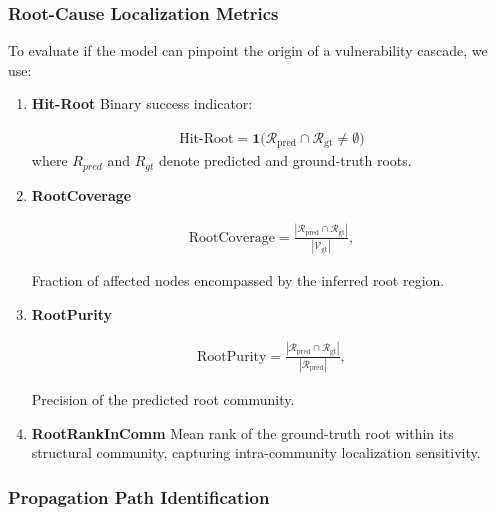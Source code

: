 \subsubsection{Root-Cause Localization Metrics}
To evaluate if the model can pinpoint the origin of a vulnerability cascade, we use:
\begin{enumerate}
    \item \textbf{Hit-Root}
    Binary success indicator:
    
    \begin{align}
    \mathrm{Hit\text{-}Root} = \mathbf{1}\bigl(\mathcal{R}_{\text{pred}} \cap \mathcal{R}_{\text{gt}} \neq \emptyset\bigr)
    \end{align}
    where $R_{pred}$ and $R_{gt}$ denote predicted and ground-truth roots.

    \item \textbf{RootCoverage}

    \begin{align}
    \mathrm{RootCoverage} = \frac{|\mathcal{R}_{\text{pred}} \cap \mathcal{R}_{\text{gt}}|}{|\mathcal{V}_{\text{gt}}|},
    \end{align}
    
    Fraction of affected nodes encompassed by the inferred root region.

    \item \textbf{RootPurity}
    
    \begin{align}
    \mathrm{RootPurity} = \frac{|\mathcal{R}_{\text{pred}} \cap \mathcal{R}_{\text{gt}}|}{|\mathcal{R}_{\text{pred}}|},
    \end{align}
    
    Precision of the predicted root community.

    \item \textbf{RootRankInComm}
    Mean rank of the ground-truth root within its structural community, capturing intra-community localization sensitivity.
    
\end{enumerate}


\subsubsection{Propagation Path Identification}

